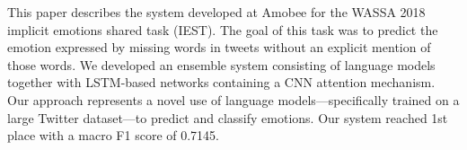 This paper describes the system developed at Amobee for the WASSA 2018 implicit emotions shared task (IEST). The goal of this task was to predict the emotion expressed by missing words in tweets without an explicit mention of those words. We developed an ensemble system consisting of language models together with LSTM-based networks containing a CNN attention mechanism. Our approach represents a novel use of language models—specifically trained on a large Twitter dataset—to predict and classify emotions. Our system reached 1st place with a macro F1 score of 0.7145.
